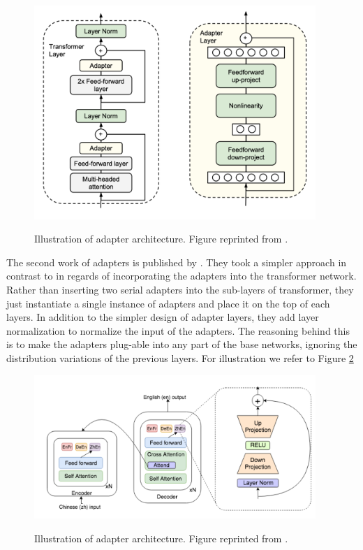 \begin{figure}[h]
    {\includegraphics[width=0.95\textwidth]{img/adapter_houlsby.png}}
    \centering
    \caption{Illustration of adapter architecture. Figure reprinted from \cite{houlsby2019parameter}.}
    \label{img:ada_houlsby}
\end{figure}

The second work of adapters is published by \cite{bapna2019simple}. They took a simpler approach in contrast to \cite{houlsby2019parameter} in regards of incorporating the adapters into the transformer network. Rather than inserting two serial adapters into the sub-layers of transformer, they just instantiate a single instance of adapters and place it on the top of each layers. In addition to the simpler design of adapter layers, they add layer normalization to normalize the input of the adapters. The reasoning behind this is to make the adapters plug-able into any part of the base networks, ignoring the distribution variations of the previous layers. For illustration we refer to Figure \ref{img:ada_bapna}

\begin{figure}[h]
    {\includegraphics[width=0.95\textwidth]{img/adapter_bapna.png}}
    \centering
    \caption{Illustration of adapter architecture. Figure reprinted from \cite{bapna2019simple}.}
    \label{img:ada_bapna}
\end{figure}

